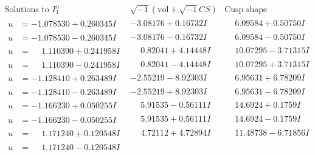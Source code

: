 \documentclass[1p]{elsarticle_modified}
\theoremstyle{definition}
\newcommand{\I}{\sqrt{-1}}
\begin{document}
$$\begin{array}{c|c|c}  
\text{Solutions to }I^u_{1}& \I (\text{vol} + \sqrt{-1}CS) & \text{Cusp shape}\\
 \hline 
\begin{aligned}
u &= -1.078530 + 0.260345 I\end{aligned}
 & -3.08176 + 0.16732 I & \phantom{-}6.09584 + 0.50750 I \\ \hline\begin{aligned}
u &= -1.078530 - 0.260345 I\end{aligned}
 & -3.08176 - 0.16732 I & \phantom{-}6.09584 - 0.50750 I \\ \hline\begin{aligned}
u &= \phantom{-}1.110390 + 0.241958 I\end{aligned}
 & \phantom{-}0.82041 + 4.14448 I & \phantom{-}10.07295 - 3.71315 I \\ \hline\begin{aligned}
u &= \phantom{-}1.110390 - 0.241958 I\end{aligned}
 & \phantom{-}0.82041 - 4.14448 I & \phantom{-}10.07295 + 3.71315 I \\ \hline\begin{aligned}
u &= -1.128410 + 0.263489 I\end{aligned}
 & -2.55219 - 8.92303 I & \phantom{-}6.95631 + 6.78209 I \\ \hline\begin{aligned}
u &= -1.128410 - 0.263489 I\end{aligned}
 & -2.55219 + 8.92303 I & \phantom{-}6.95631 - 6.78209 I \\ \hline\begin{aligned}
u &= -1.166230 + 0.050255 I\end{aligned}
 & \phantom{-}5.91535 - 0.56111 I & \phantom{-}14.6924 + 0.1759 I \\ \hline\begin{aligned}
u &= -1.166230 - 0.050255 I\end{aligned}
 & \phantom{-}5.91535 + 0.56111 I & \phantom{-}14.6924 - 0.1759 I \\ \hline\begin{aligned}
u &= \phantom{-}1.171240 + 0.120548 I\end{aligned}
 & \phantom{-}4.72112 + 4.72894 I & \phantom{-}11.48738 - 6.71856 I \\ \hline\begin{aligned}
u &= \phantom{-}1.171240 - 0.120548 I\end{aligned}

\end{array}$$
\end{document}
